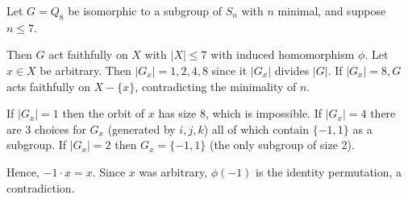\documentclass{article}
\begin{document}
Let $G = Q_8$ be isomorphic to a subgroup of $S_n$ with $n$ minimal, and suppose $n \le 7$.

Then $G$ act faithfully on $X$ with $|X| \le 7$ with induced homomorphism $\phi$. Let $x \in X$ be arbitrary. Then $|G_x| = 1, 2, 4, 8$ since it $|G_x|$ divides $|G|$. If $|G_x| = 8, G$ acts faithfully on $X - \{x\}$, contradicting the minimality of $n$. 

If $|G_x| = 1$ then the orbit of $x$ has size 8, which is impossible. If $|G_x| = 4$ there are 3 choices for $G_x$ (generated by $i, j, k$) all of which contain $\{-1, 1\}$ as a subgroup. If $|G_x| = 2$ then $G_x = \{-1, 1\}$ (the only subgroup of size 2).

Hence, $-1 \cdot x = x$. Since $x$ was arbitrary, $\phi(-1)$ is the identity permutation, a contradiction.
\end{document}
